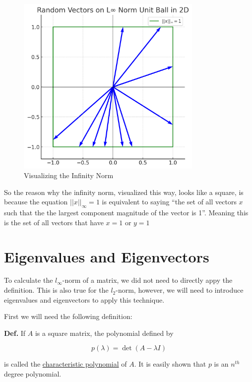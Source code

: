 \documentclass[12pt]{article}
\begin{document}
\begin{figure}[h]
  \centering
  \includegraphics[width=0.8\textwidth]{./infinity_norm.png}
  \caption{Visualizing the Infinity Norm}
\end{figure}

So the reason why the infinity norm, visualized this way,
looks like a square, is because the equation $||x||_\infty = 1$ is equivalent 
to saying \enquote{the set of all vectors $x$ such that the the largest 
component magnitude of the vector is 1}. Meaning this is the set of all vectors
that have $x=1$ or $y=1$

\section{Eigenvalues and Eigenvectors} %

To calculate the $l_\infty$-norm of a matrix, we did not need to directly
appy the definition. This is also true for the $l_2$-norm, however, we will need
to introduce eigenvalues and eigenvectors to apply this technique.

First we will need the following definition:

\noindent
\textbf{Def.} If $A$ is a square matrix, the polynomial defined by

\begin{equation*}
  p(\lambda) = \det(A-\lambda I)
\end{equation*}

\noindent
\hangindent=0.5cm
is called the \uline{characteristic polynomial} of $A$. It is easily shown that
$p$ is an $n^{th}$ degree polynomial.
\end{document}
